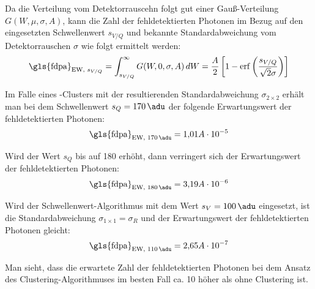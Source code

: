 \noindent
Da die Verteilung vom Detektorrauscehn folgt gut einer Gauß-Verteilung $G(W, \mu, \sigma, A)$, kann die Zahl der fehldetektierten Photonen im Bezug auf den eingesetzten Schwellenwert $s_{V/Q}$ und bekannte Standardabweichung vom Detektorrauschen $\sigma$ wie folgt ermittelt werden: 
\begin{equation}
    \text{\gls{fdpa}}_{\text{EW, $s_{V/Q}$}}=\int_{s_{V/Q}}^\infty G(W, 0, \sigma, A) \,dW = \frac{A}{2}\left[1 - \erf\left({\frac{s_{V/Q}}{\sqrt{2}\sigma}}\right)\right]
\end{equation}

\noindent
Im Falle eines -Clusters mit der resultierenden Standardabweichung $\sigma_{2\times 2}$ erhält man bei dem Schwellenwert $s_Q = \SI{170}{\adu}$ der folgende Erwartungswert der fehldetektierten Photonen:
\begin{equation}
     \text{\gls{fdpa}}_{\text{EW, \SI{170}{\adu}}} = 1{,}01A\cdot 10^{-5} %
\end{equation}

\noindent
Wird der Wert $s_Q$ bis auf \SI{180}{\adu} erhöht, dann verringert sich der Erwartungswert der fehldetektierten Photonen:
\begin{equation}
    \text{\gls{fdpa}}_{\text{EW, \SI{180}{\adu}}} = 3{,}19A\cdot 10^{-6} %
\end{equation}

\noindent
Wird der Schwellenwert-Algorithmus mit dem Wert $s_V = \SI{100}{\adu}$ eingesetzt, ist die Standardabweichung $\sigma_{1\times 1} = \sigma_{R}$ und der Erwartungswert der fehldetektierten Photonen gleicht:
\begin{equation}
   \text{\gls{fdpa}}_{\text{EW, \SI{110}{\adu}}} = 2{,}65A\cdot 10^{-7} %
\end{equation}

\noindent
Man sieht, dass die erwartete Zahl der fehldetektierten Photonen bei dem Ansatz des Clustering-Al\-go\-rith\-muses im besten Fall ca. 10 höher als ohne Clustering ist. 

